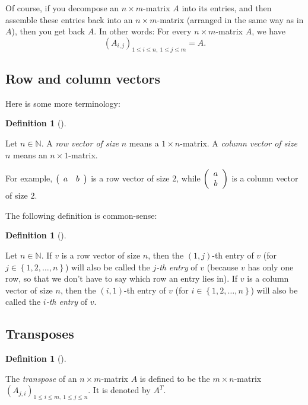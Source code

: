 \documentclass[numbers=enddot,12pt,final,onecolumn,notitlepage]{scrartcl}%
\theoremstyle{definition}
\newtheorem{defi}[theo]{Definition}
\newenvironment{definition}[1][]
{\begin{defi}[#1]\begin{leftbar}}
{\end{leftbar}\end{defi}}
\begin{document}
Of course, if you decompose an $n\times m$-matrix $A$ into its entries, and
then assemble these entries back into an $n\times m$-matrix (arranged in the
same way as in $A$), then you get back $A$. In other words: For every $n\times
m$-matrix $A$, we have%
\begin{equation}
\left(  A_{i,j}\right)  _{1\leq i\leq n,\ 1\leq j\leq m}=A.
\label{eq.matrix.A-through-Aij}%
\end{equation}


\subsection{Row and column vectors}

Here is some more terminology:

\begin{definition}
Let $n\in\mathbb{N}$. A \textit{row vector of size }$n$ means a $1\times
n$-matrix. A \textit{column vector of size }$n$ means an $n\times1$-matrix.
\end{definition}

For example, $\left(
\begin{array}
[c]{cc}%
a & b
\end{array}
\right)  $ is a row vector of size $2$, while $\left(
\begin{array}
[c]{c}%
a\\
b
\end{array}
\right)  $ is a column vector of size $2$.

The following definition is common-sense:

\begin{definition}
Let $n\in\mathbb{N}$. If $v$ is a row vector of size $n$, then the $\left(
1,j\right)  $-th entry of $v$ (for $j\in\left\{  1,2,\ldots,n\right\}  $) will
also be called the $j$\textit{-th entry} of $v$ (because $v$ has only one row,
so that we don't have to say which row an entry lies in). If $v$ is a column
vector of size $n$, then the $\left(  i,1\right)  $-th entry of $v$ (for
$i\in\left\{  1,2,\ldots,n\right\}  $) will also be called the $i$\textit{-th
entry} of $v$.
\end{definition}

\subsection{Transposes}

\begin{definition}
The \textit{transpose} of an $n\times m$-matrix $A$ is defined to be the
$m\times n$-matrix $\left(  A_{j,i}\right)  _{1\leq i\leq m,\ 1\leq j\leq n}$.
It is denoted by $A^{T}$.
\end{definition}
\end{document}
